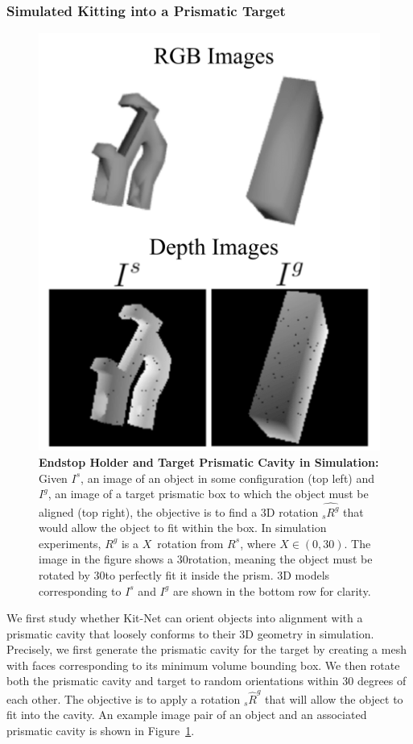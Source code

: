 \subsubsection{Simulated Kitting into a Prismatic Target}
\label{subsubsec:prismatic}
\begin{figure}[t]
  \vspace{8pt}
  \centering
  \includegraphics[width=0.8\linewidth]{figures/prismatic_example_labeled.png}
  \caption{\textbf{Endstop Holder and Target Prismatic Cavity in Simulation: } Given $I^s$, an image of an object in some configuration (top left) and $I^g$, an image of a target prismatic box to which the object must be aligned (top right), the objective is to find a 3D rotation $\hat{{_s}R^g}$ that would allow the object to fit within the box. In simulation experiments, $R^g$ is a $X$\degree~rotation from $R^s$, where $X\in (0,30)$. The image in the figure shows a 30\degree rotation, meaning the object must be rotated by 30\degree to perfectly fit it inside the prism. 3D models corresponding to $I^s$ and $I^g$ are shown in the bottom row for clarity. 
  }
  \label{fig:prism-task}
\end{figure}

We first study whether Kit-Net can orient objects into alignment with a prismatic cavity that loosely conforms to their 3D geometry in simulation. Precisely, we first generate the prismatic cavity for the target by creating a mesh with faces corresponding to its minimum volume bounding box. We then rotate both the prismatic cavity and target to random orientations within 30 degrees of each other. The objective is to apply a rotation ${_s}\hat{R}^g$ that will allow the object to fit into the cavity. An example image pair of an object and an associated prismatic cavity is shown in Figure~\ref{fig:prism-task}.

